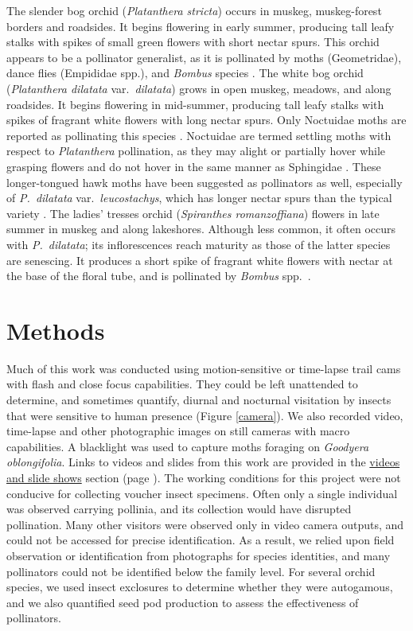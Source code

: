 \begin{multicols}{2}
The slender bog orchid (\emph{Platanthera stricta}) occurs in muskeg,
muskeg-forest borders and roadsides. It begins flowering in early
summer, producing tall leafy stalks with spikes of small green flowers
with short nectar spurs. This orchid appears to be a pollinator
generalist, as it is pollinated by moths (Geometridae), dance flies
(Empididae spp.), and \emph{Bombus} species \citep{Pattetal1989}.
The white bog orchid (\emph{Platanthera dilatata} var.\ \emph{dilatata})
grows in open muskeg, meadows, and along roadsides. It begins flowering
in mid-summer, producing tall leafy stalks with spikes of fragrant white
flowers with long nectar spurs. Only Noctuidae moths are reported as
pollinating this species \citep{Larson1992}. Noctuidae are termed settling
moths with respect to \emph{Platanthera} pollination, as they may alight
or partially hover while grasping flowers and do not hover in the same
manner as Sphingidae \citep{HapemanInoue1997}. These longer-tongued hawk
moths have been suggested as pollinators as well, especially of \emph{P.\
dilatata} var.\ \emph{leucostachys}, which has longer nectar spurs than the
typical variety \citep{Sheviak2002}. The ladies' tresses orchid
(\emph{Spiranthes romanzoffiana}) flowers in late summer in muskeg and
along lakeshores. Although less common, it often occurs with \emph{P.\
dilatata}; its inflorescences reach maturity as those of the latter
species are senescing. It produces a short spike of fragrant white
flowers with nectar at the base of the floral tube, and is pollinated by
\emph{Bombus} spp.\ \citep{LarsonLarson1987}.

\section{Methods}

Much of this work was conducted using motion-sensitive or time-lapse
trail cams with flash and close focus capabilities. They could be left
unattended to determine, and sometimes quantify, diurnal and nocturnal
visitation by insects that were sensitive to human presence (Figure \ref{camera}).
We also recorded video, time-lapse and other photographic images on
still cameras with macro capabilities. A blacklight was used to capture
moths foraging on \emph{Goodyera oblongifolia}. Links to videos and
slides from this work are provided in the \hyperref[videos]{videos and slide shows} section (page \pageref{videos}). The working conditions
for this project were not conducive for collecting voucher insect
specimens. Often only a single individual was observed carrying
pollinia, and its collection would have disrupted pollination. Many
other visitors were observed only in video camera outputs, and could not
be accessed for precise identification. As a result, we relied upon
field observation or identification from photographs for species
identities, and many pollinators could not be identified below the
family level. For several orchid species, we used insect exclosures to
determine whether they were autogamous, and we also quantified seed pod
production to assess the effectiveness of pollinators.

\end{multicols}
